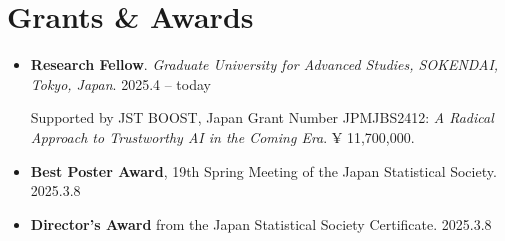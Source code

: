 \documentclass[
  11pt,
]{article}
\renewcommand{\labelitemi}{\textcolor{minty}{\faCheckCircle}} %
\begin{document}
\section{Grants \& Awards}\label{grants-awards}

\renewcommand{\labelitemi}{\textcolor{minty}{\faAward}}

\begin{itemize}
\item
  \textbf{Research Fellow}. \emph{Graduate University for Advanced
  Studies, SOKENDAI, Tokyo, Japan}. \hfill {2025.4 -- today}

  Supported by JST BOOST, Japan Grant Number JPMJBS2412: \emph{A Radical
  Approach to Trustworthy AI in the Coming Era}. ¥ 11,700,000.
\item
  \textbf{Best Poster Award}, 19th Spring Meeting of the Japan
  Statistical Society. \hfill {2025.3.8}
\item
  \textbf{Director's Award} from the Japan Statistical Society
  Certificate. \hfill {2025.3.8}
\end{itemize}

\renewcommand{\labelitemi}{\textcolor{minty}{\faBookmark}}
\end{document}
